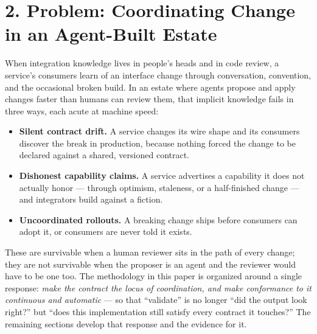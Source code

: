 \documentclass[11pt]{article}
\begin{document}
\section*{2. Problem: Coordinating Change in an Agent-Built Estate}
When integration knowledge lives in people's heads and in code review, a service's consumers learn of
an interface change through conversation, convention, and the occasional broken build. In an estate
where agents propose and apply changes faster than humans can review them, that implicit knowledge
fails in three ways, each acute at machine speed:
\begin{itemize}[leftmargin=*]
  \item \textbf{Silent contract drift.} A service changes its wire shape and its consumers discover
        the break in production, because nothing forced the change to be declared against a shared,
        versioned contract.
  \item \textbf{Dishonest capability claims.} A service advertises a capability it does not actually
        honor --- through optimism, staleness, or a half-finished change --- and integrators build
        against a fiction.
  \item \textbf{Uncoordinated rollouts.} A breaking change ships before consumers can adopt it, or
        consumers are never told it exists.
\end{itemize}
These are survivable when a human reviewer sits in the path of every change; they are not survivable
when the proposer is an agent and the reviewer would have to be one too. The methodology in this paper
is organized around a single response: \emph{make the contract the locus of coordination, and make
conformance to it continuous and automatic} --- so that ``validate'' is no longer ``did the output
look right?'' but ``does this implementation still satisfy every contract it touches?'' The remaining
sections develop that response and the evidence for it.
\end{document}
